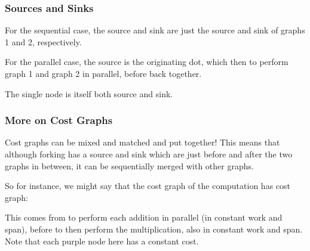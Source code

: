 \documentclass[aspectratio=169]{beamer}
\newcommand{\fhex}[3][]{\node[hex, #1, fill=hexcolor, minimum width=0.4in] (#2) {#3}}
\begin{document}
\begin{frame}[fragile]
  \frametitle{Sources and Sinks}

  For the sequential case, the source and sink are just the source and sink of
  graphs 1 and 2, respectively.

  \pause
  \vspace{\fill}

  For the parallel case, the source is the originating dot, which then
   to perform graph 1 and graph 2 in parallel, before 
  back together.

  \pause
  \vspace{\fill}

  The single node is itself both source and sink.
\end{frame}

\begin{frame}[fragile]
  \frametitle{More on Cost Graphs}

  \begin{center}
  \begin{minipage}{0.5\textwidth}
    \raggedright

  Cost graphs can be mixed and matched and put together! This means that
  although forking has a source and sink which are just before
  and after the two graphs in between, it can be sequentially merged with
  other graphs.

  \vspace{10pt}

    So for instance, we might say that the cost graph of the computation
     has cost graph:
  \end{minipage}
  \begin{minipage}{0.49\textwidth}
    \centering
  \end{minipage}
  \end{center}

  \pause
  \vspace{10pt}

  This comes from  to perform each addition in parallel
  (in constant work and span), before  to then perform
  the multiplication, also in constant work and span. Note that each
  purple node here has a constant cost.
\end{frame}
\end{document}
